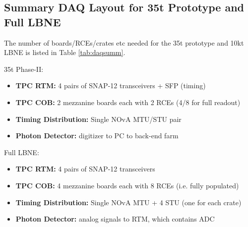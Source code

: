 \subsection{Summary DAQ Layout for 35t Prototype and Full LBNE}

The number of boards/RCEs/crates etc needed for the 35t prototype and 10kt LBNE is listed in Table \ref{tab:daqsumm}.  

35t Phase-II:  
\begin{itemize}
\item  \textbf{TPC RTM: }  4 pairs of SNAP-12 transceivers + SFP (timing)
\item  \textbf{TPC COB:  }  2 mezzanine boards each with 2 RCEs (4/8 for full readout)
\item  \textbf{Timing Distribution:  }    Single NOvA MTU/STU pair
 \item  \textbf{Photon Detector:  }    digitizer to PC to back-end farm 
\end{itemize}


Full LBNE:
\begin{itemize}
\item  \textbf{TPC RTM: }  4 pairs of SNAP-12 transceivers 
\item  \textbf{TPC COB:  }  4 mezzanine boards each with 8 RCEs (i.e. fully populated)
\item  \textbf{Timing Distribution:  }    Single NOvA MTU + 4 STU (one for each crate)
 \item  \textbf{Photon Detector:  }    analog signals to RTM, which contains ADC
\end{itemize}


